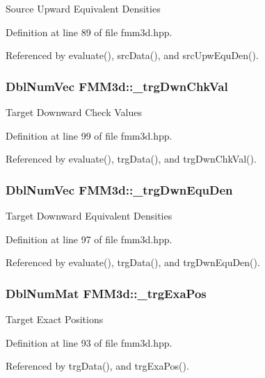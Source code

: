 Source Upward Equivalent Densities 

Definition at line 89 of file fmm3d.hpp.

Referenced by evaluate(), src\-Data(), and src\-Upw\-Equ\-Den().
\subsubsection{\setlength{\rightskip}{0pt plus 5cm}Dbl\-Num\-Vec {\bf FMM3d::\_\-trg\-Dwn\-Chk\-Val}\hspace{0.3cm}{\tt  [protected]}}\label{classFMM3d_94de8ba09a81e33d09cbf5ab3ba734fc_94de8ba09a81e33d09cbf5ab3ba734fc}


Target Downward Check Values 

Definition at line 99 of file fmm3d.hpp.

Referenced by evaluate(), trg\-Data(), and trg\-Dwn\-Chk\-Val().
\subsubsection{\setlength{\rightskip}{0pt plus 5cm}Dbl\-Num\-Vec {\bf FMM3d::\_\-trg\-Dwn\-Equ\-Den}\hspace{0.3cm}{\tt  [protected]}}\label{classFMM3d_f43c56438e336c8cdf528f44c20e6807_f43c56438e336c8cdf528f44c20e6807}


Target Downward Equivalent Densities 

Definition at line 97 of file fmm3d.hpp.

Referenced by evaluate(), trg\-Data(), and trg\-Dwn\-Equ\-Den().
\subsubsection{\setlength{\rightskip}{0pt plus 5cm}Dbl\-Num\-Mat {\bf FMM3d::\_\-trg\-Exa\-Pos}\hspace{0.3cm}{\tt  [protected]}}\label{classFMM3d_6041da11603ebb8618f5e84b0443ec67_6041da11603ebb8618f5e84b0443ec67}


Target Exact Positions 

Definition at line 93 of file fmm3d.hpp.

Referenced by trg\-Data(), and trg\-Exa\-Pos().
